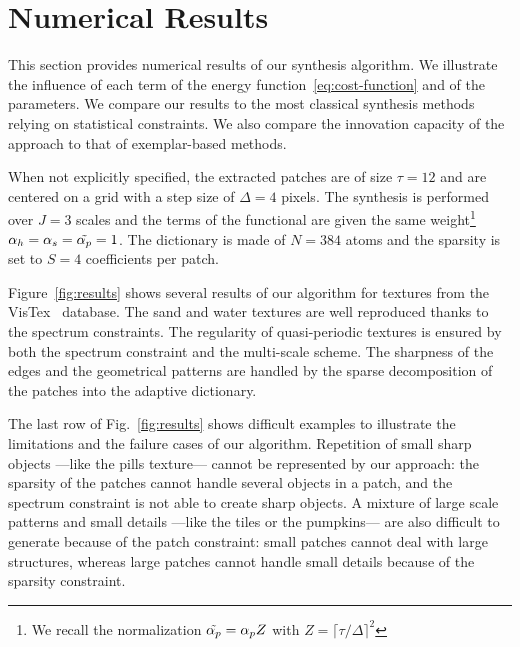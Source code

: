 \section{Numerical Results}
\label{sec:results}

\newcommand{\img}[3][]{\texttt{[image: \#3]}}
\newcommand{\imsep}[0]{\!\!\!\!\!\!\!&}


This section provides numerical results of our synthesis algorithm.
We illustrate the influence of each term of the energy function~\eqref{eq:cost-function} and of the parameters.
We compare our results to the most classical synthesis methods relying on statistical constraints.
We also compare the innovation capacity of the approach to that of exemplar-based methods.

When not explicitly specified, the extracted patches are of size $\tau=12$ and are centered on a grid with a step size of $\Delta=4$ pixels.
The synthesis is performed over $J=3$ scales and the terms of the functional are given the same weight\footnote{We recall the normalization $\tilde{\alpha_p}=\alpha_p Z$ with $Z = \lceil\tau/\Delta\rceil^2$} $\alpha_h=\alpha_s=\tilde{\alpha_p}=1$.
The dictionary is made of $N=384$ atoms and the sparsity is set to $S=4$ coefficients per patch.

Figure~\ref{fig:results} shows several results of our algorithm for textures from the VisTex~\cite{pickard1995vistex} database.
The sand and water textures are well reproduced thanks to the spectrum constraints.
The regularity of quasi-periodic textures is ensured by both the spectrum constraint and the multi-scale scheme.
The sharpness of the edges and the geometrical patterns are handled by the sparse decomposition of the patches into the adaptive dictionary.

The last row of Fig.~\ref{fig:results} shows difficult examples to illustrate the limitations and the failure cases of our algorithm.
Repetition of small sharp objects ---like the pills texture--- cannot be represented by our approach: the sparsity of the patches cannot handle several objects in a patch, and the spectrum constraint is not able to create sharp objects.
A mixture of large scale patterns and small details ---like the tiles or the pumpkins--- are also difficult to generate because of the patch constraint: small patches cannot deal with large structures, whereas large patches cannot handle small details because of the sparsity constraint.


